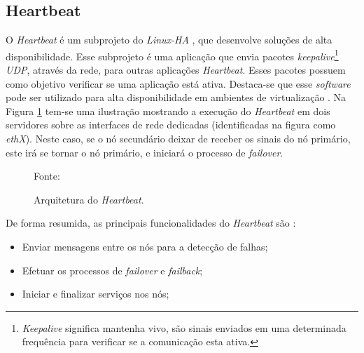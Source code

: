 
\subsection{Heartbeat}
\label{section:heartbeat}
O \textit{Heartbeat} é um subprojeto do \textit{Linux-HA} \cite{linuxha}, que desenvolve soluções de alta disponibilidade.
Esse subprojeto é uma aplicação que envia pacotes \textit{keepalive}\footnote{\textit{Keepalive} significa mantenha vivo, são sinais 
enviados em uma determinada frequência para verificar se a comunicação esta ativa.} \textit{\ac{UDP}}, 
através da rede, para outras aplicações \textit{Heartbeat}. Esses pacotes possuem como objetivo verificar se uma aplicação está ativa.
Destaca-se que esse \textit{software} pode ser utilizado para alta disponibilidade em ambientes de virtualização \cite{reis2009}.
Na Figura \ref{fig:heartbeat} tem-se uma ilustração mostrando a execução do \textit{Heartbeat} em dois servidores sobre as interfaces de rede 
dedicadas (identificadas na figura como \textit{ethX}).
Neste caso, se o nó secundário deixar de receber os sinais do nó primário, este irá se tornar o nó primário, e iniciará o processo de 
\textit{failover}. 
\begin{figure}[h!]
 \centering
 \caption{Arquitetura do \textit{Heartbeat}.}
 Fonte: \citet{zaminhani2008}
 \label{fig:heartbeat}
\end{figure}

De forma resumida, as principais funcionalidades do \textit{Heartbeat} são \cite{clusterlabs}:
\begin{itemize}
 \item Enviar mensagens entre os nós para a detecção de falhas;
 \item Efetuar os processos de \textit{failover} e \textit{failback};
 \item Iniciar e finalizar serviços nos nós;
\end{itemize}


